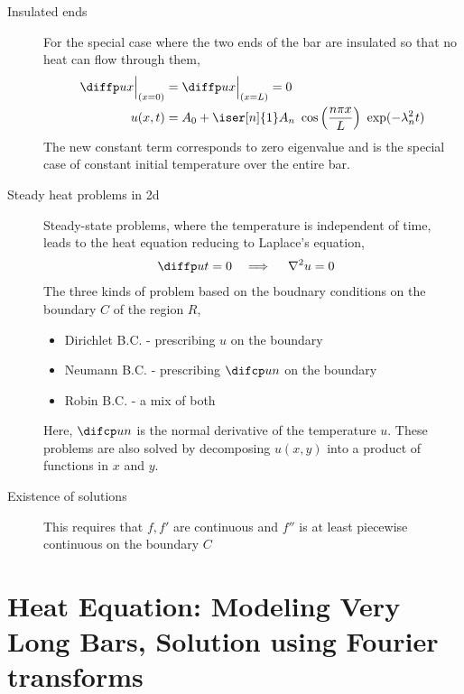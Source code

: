 \begin{description}
    \item[Insulated ends] For the special case where the two ends of the bar are
        insulated so that no heat can flow through them,
        \begin{align}
            \diffp ux \Big|_{(x = 0)} & = \diffp ux \Big|_{(x = L)} = 0     \\
            u(x, t)                   & = A_0 + \iser[n]{1} A_n\ \cos\left(
            \frac{n\pi x}{L} \right)\ \exp(-\lambda_n^2 t)
        \end{align}
        The new constant term corresponds to zero eigenvalue and is the special case of
        constant initial temperature over the entire bar.

    \item[Steady heat problems in 2d] Steady-state problems, where the temperature is
        independent of time, leads to the heat equation reducing to Laplace's equation,
        \begin{align}
            \diffp ut & = 0 & \implies \quad \nabla^2 u & = 0
        \end{align}
        The three kinds of problem based on the boudnary conditions on the boundary
        $ C $ of the region $ R $,
        \begin{itemize}
            \item Dirichlet B.C. - prescribing $ u $ on the boundary
            \item Neumann B.C. - prescribing $ \difcp un $ on the boundary
            \item Robin B.C. - a mix of both
        \end{itemize}
        Here, $ \difcp un $ is the normal derivative of the temperature $ u $. These
        problems are also solved by decomposing $ u(x, y) $ into a product of functions
        in $ x $ and $ y $. \par

    \item[Existence of solutions] This requires that $ f, f' $ are continuous and
        $ f'' $ is at least piecewise continuous on the boundary $ C $
\end{description}


\section{Heat Equation: Modeling Very Long Bars, Solution using Fourier transforms}

